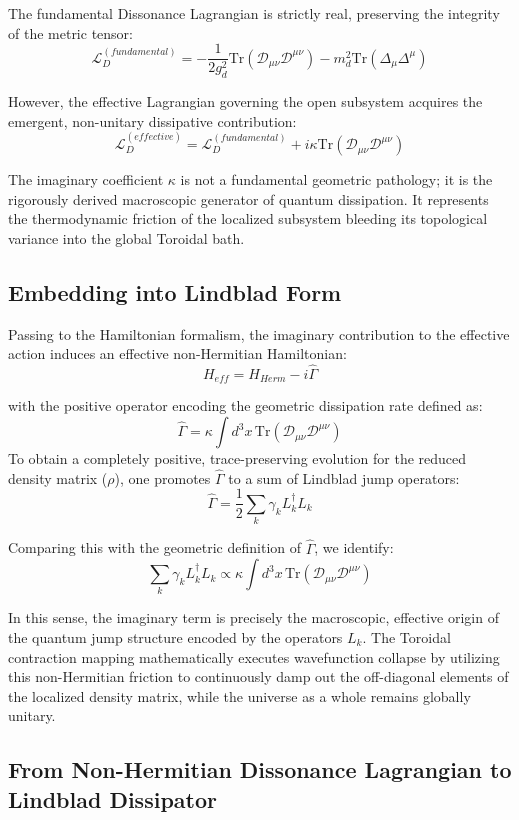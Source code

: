 \documentclass[12pt,openany]{book}
\theoremstyle{plain}
\theoremstyle{definition}
\theoremstyle{remark}
\begin{document}
The fundamental Dissonance Lagrangian is strictly real, preserving the integrity of the metric tensor:$$\mathcal{L}_{D}^{(fundamental)} = -\frac{1}{2g_d^2}\text{Tr}(\mathcal{D}_{\mu\nu}\mathcal{D}^{\mu\nu}) - m_d^2 \text{Tr}(\Delta_\mu\Delta^\mu)$$

However, the effective Lagrangian governing the open subsystem acquires the emergent, non-unitary dissipative contribution:$$\mathcal{L}_{D}^{(effective)} = \mathcal{L}_{D}^{(fundamental)} + i \kappa \text{Tr}(\mathcal{D}_{\mu\nu}\mathcal{D}^{\mu\nu})$$

The imaginary coefficient $\kappa$ is not a fundamental geometric pathology; it is the rigorously derived macroscopic generator of quantum dissipation. It represents the thermodynamic friction of the localized subsystem bleeding its topological variance into the global Toroidal bath.

\subsection* {Embedding into Lindblad Form}
Passing to the Hamiltonian formalism, the imaginary contribution to the effective action induces an effective non-Hermitian Hamiltonian:$$H_{eff} = H_{Herm} - i \hat{\Gamma}$$

with the positive operator encoding the geometric dissipation rate defined as:$$\hat{\Gamma} = \kappa \int d^3x \, \text{Tr}(\mathcal{D}_{\mu\nu}\mathcal{D}^{\mu\nu})$$To obtain a completely positive, trace-preserving evolution for the reduced density matrix ($\rho$), one promotes $\hat{\Gamma}$ to a sum of Lindblad jump operators:$$\hat{\Gamma} = \frac{1}{2}\sum_k \gamma_k L_k^\dagger L_k$$

Comparing this with the geometric definition of $\hat{\Gamma}$, we identify:$$\sum_k \gamma_k L_k^\dagger L_k \propto \kappa \int d^3x \, \text{Tr}(\mathcal{D}_{\mu\nu}\mathcal{D}^{\mu\nu})$$

In this sense, the imaginary term is precisely the macroscopic, effective origin of the quantum jump structure encoded by the operators $L_k$. The Toroidal contraction mapping mathematically executes wavefunction collapse by utilizing this non-Hermitian friction to continuously damp out the off-diagonal elements of the localized density matrix, while the universe as a whole remains globally unitary.

\subsection*{From Non-Hermitian Dissonance Lagrangian to Lindblad Dissipator}
\end{document}
